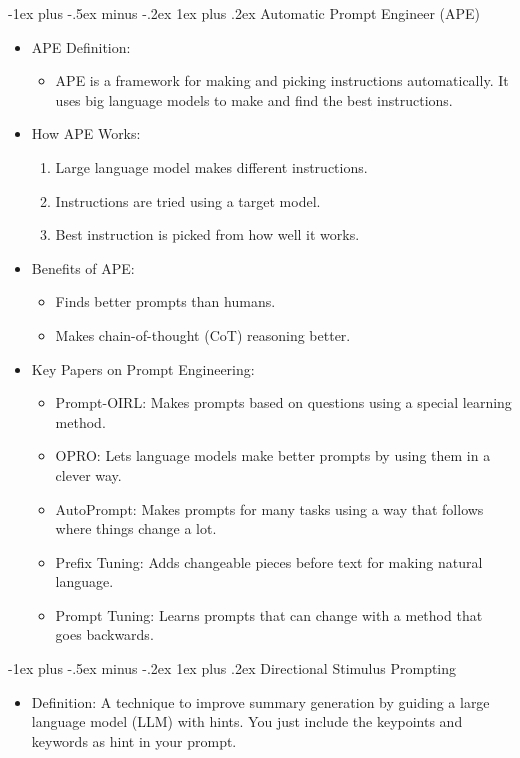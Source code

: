 \documentclass[10pt,landscape]{article}
\makeatletter
\renewcommand{\subsection}{\@startsection{subsection}{2}{0mm}%
                                {-1explus -.5ex minus -.2ex}%
                                {0.5ex plus .2ex}%
                                {\normalfont\normalsize\bfseries}}
\renewcommand{\subsection}{\@startsection{subsection}{3}{0mm}%
                                {-1ex plus -.5ex minus -.2ex}%
                                {1ex plus .2ex}%
                                {\normalfont\small\bfseries}}
\makeatother
\begin{document}
\begin{multicols}{3}
\subsection{Automatic Prompt Engineer (APE)}
\begin{itemize}
    \item APE Definition:
    \begin{itemize}
        \item APE is a framework for making and picking instructions automatically. It uses big language models to make and find the best instructions.
    \end{itemize}
    \item How APE Works:
    \begin{enumerate}
        \item Large language model makes different instructions.
        \item Instructions are tried using a target model.
        \item Best instruction is picked from how well it works.
    \end{enumerate}
    \item Benefits of APE:
    \begin{itemize}
        \item Finds better prompts than humans.
        \item Makes chain-of-thought (CoT) reasoning better.
    \end{itemize}
    \item Key Papers on Prompt Engineering:
    \begin{itemize}
        \item Prompt-OIRL: Makes prompts based on questions using a special learning method.
        \item OPRO: Lets language models make better prompts by using them in a clever way.
        \item AutoPrompt: Makes prompts for many tasks using a way that follows where things change a lot.
        \item Prefix Tuning: Adds changeable pieces before text for making natural language.
        \item Prompt Tuning: Learns prompts that can change with a method that goes backwards.
    \end{itemize}
\end{itemize}

\subsection{Directional Stimulus Prompting}
\begin{itemize}
    \item Definition: A technique to improve summary generation by guiding a large language model (LLM) with hints. You just include the keypoints and keywords as hint in your prompt.
\end{itemize}


\end{multicols}
\end{document}
